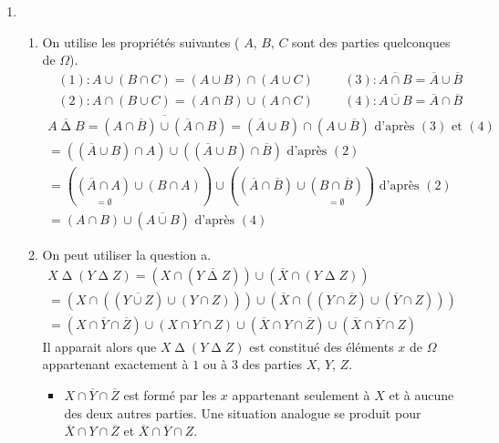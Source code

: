 \begin{enumerate}
\item \begin{enumerate}
 \item On utilise les propriétés suivantes ( $A$, $B$, $C$ sont des parties quelconques de $\Omega$).
\begin{align*}
 &(1) : A\cup(B\cap C) = (A\cup B) \cap (A\cup C) & &
 &(3) : \overline{A\cap B} = \overline{A} \cup \overline{B} \\
 &(2) : A\cap(B\cup C) = (A\cap B) \cup (A\cap C) & &
 &(4) : \overline{A\cup B} = \overline{A} \cap \overline{B}
\end{align*}
\begin{multline*}
 \overline{A \mathop{\Delta}  B}
=\overline{(A\cap\overline{B})\cup(\overline{A}\cap B)}
= (\overline{A}\cup B) \cap (A\cup \overline{B}) \text{ d'après $(3)$ et $(4)$}\\
= \left((\overline{A}\cup B)\cap A \right) \cup \left( (\overline{A}\cup B)\cap \overline{B}\right) \text{ d'après $(2)$}\\
=\left( \underset{=\emptyset}{(\overline{A}\cap A)}\cup(B\cap A)\right)\cup \left((\overline{A}\cap \overline{B})\cup \underset{=\emptyset}{(B\cap \overline{B})} \right) \text{ d'après $(2)$}\\
= (A\cap B) \cup (\overline{A\cup B})\text{ d'après $(4)$}
\end{multline*}
\item On peut utiliser la question a.
\begin{multline*}
 X \mathop{\Delta} \left(Y \mathop{\Delta}  Z \right)=
\left(X\cap (\overline{Y \mathop{\Delta}  Z}) \right) \cup \left(\overline{X}\cap(Y \mathop{\Delta}  Z) \right) \\
=\left( X\cap \left( (\overline{Y\cup Z})\cup (Y\cap Z)\right) \right) \cup \left( \overline{X}\cap\left((Y\cap \overline{Z})\cup (\overline{Y}\cap Z) \right) \right)\\
=\left(X\cap\overline{Y}\cap \overline{Z} \right) \cup
 \left(X \cap Y \cap Z \right) \cup 
 \left(\overline{X}\cap Y \cap \overline{Z} \right) \cup
 \left(\overline{X}\cap \overline{Y}\cap Z \right)
\end{multline*}
Il apparait alors que $X \mathop{\Delta} \left(Y \mathop{\Delta}  Z \right)$ est constitué des éléments $x$ de $\Omega$ appartenant exactement à $1$ ou à $3$ des parties $X$, $Y$, $Z$.
\begin{itemize}
 \item $X\cap\overline{Y}\cap \overline{Z}$ est formé par les $x$ appartenant seulement à $X$ et à aucune des deux autres parties. Une situation analogue se produit pour $\overline{X}\cap Y \cap \overline{Z}$ et $\overline{X}\cap \overline{Y}\cap Z$.

\end{itemize}
\end{enumerate}
\end{enumerate}
